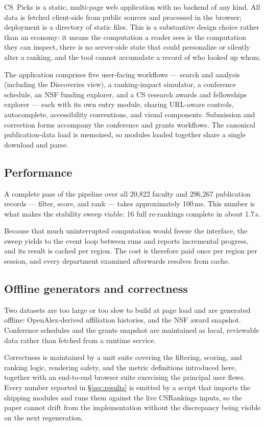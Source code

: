 \documentclass[11pt]{article}
\newcommand{\sys}{CS~Picks}
\newcommand{\csr}{CSRankings}
\begin{document}
\sys{} is a static, multi-page web application with no backend of any kind. All
data is fetched client-side from public sources and processed in the browser;
deployment is a directory of static files. This is a substantive design choice
rather than an economy: it means the computation a reader sees is the
computation they can inspect, there is no server-side state that could
personalize or silently alter a ranking, and the tool cannot accumulate a
record of who looked up whom.

The application comprises five user-facing workflows --- search and analysis
(including the Discoveries view), a ranking-impact simulator, a conference
schedule, an NSF funding explorer, and a CS research awards and fellowships
explorer --- each with its own entry module, sharing URL-aware controls,
autocomplete, accessibility conventions, and visual components. Submission and
correction forms accompany the conference and grants workflows. The canonical
publication-data load is memoized, so modules loaded together share a single
download and parse.

\subsection{Performance}

A complete pass of the pipeline over all 20{,}822 faculty and 296{,}267
publication records --- filter, score, and rank --- takes approximately
100\,ms. This number is what makes the stability sweep viable: 16 full
re-rankings complete in about 1.7\,s.

Because that much uninterrupted computation would freeze the interface, the
sweep yields to the event loop between runs and reports incremental progress,
and its result is cached per region. The cost is therefore paid once per
region per session, and every department examined afterwards resolves from
cache.

\subsection{Offline generators and correctness}

Two datasets are too large or too slow to build at page load and are generated
offline: OpenAlex-derived affiliation histories, and the NSF award snapshot.
Conference schedules and the grants snapshot are maintained as local,
reviewable data rather than fetched from a runtime service.

Correctness is maintained by a unit suite covering the filtering, scoring, and
ranking logic, rendering safety, and the metric definitions introduced here,
together with an end-to-end browser suite exercising the principal user flows.
Every number reported in \S\ref{sec:results} is emitted by a script that
imports the shipping modules and runs them against the live \csr{} inputs, so
the paper cannot drift from the implementation without the discrepancy being
visible on the next regeneration.
\end{document}
